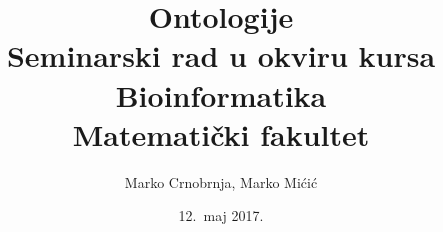 \documentclass[a4paper]{article}
\begin{document}
\title{Ontologije \\ \small{Seminarski rad u okviru kursa\\Bioinformatika\\ Matematički fakultet}}

\author{Marko Crnobrnja, Marko Mićić}
\date{12.~maj 2017.}
\maketitle

\abstract{}

\tableofcontents

\newpage

 




\end{document}
